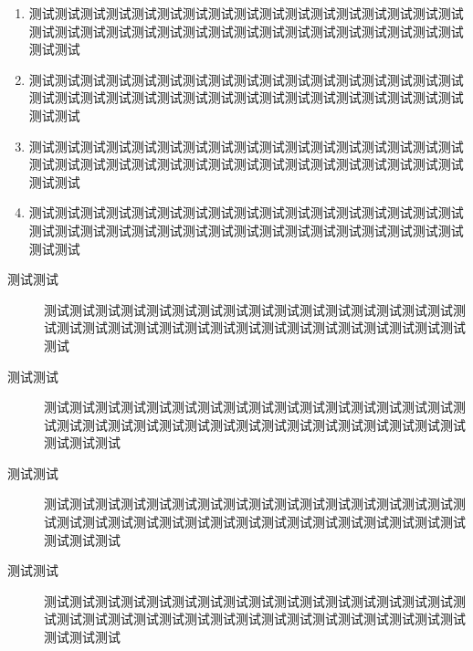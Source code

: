 \documentclass[degree=phd,nlcover]{njuthesis}
\begin{document}
\begin{enumerate}
    \item 测试测试测试测试测试测试测试测试测试测试测试测试测试测试测试测试测试测试测试测试测试测试测试测试测试测试测试测试测试测试测试测试测试测试测试测试
    \item 测试测试测试测试测试测试测试测试测试测试测试测试测试测试测试测试测试测试测试测试测试测试测试测试测试测试测试测试测试测试测试测试测试测试测试测试
    \item 测试测试测试测试测试测试测试测试测试测试测试测试测试测试测试测试测试测试测试测试测试测试测试测试测试测试测试测试测试测试测试测试测试测试测试测试
    \item 测试测试测试测试测试测试测试测试测试测试测试测试测试测试测试测试测试测试测试测试测试测试测试测试测试测试测试测试测试测试测试测试测试测试测试测试
\end{enumerate}

\begin{description}
    \item[测试测试] 测试测试测试测试测试测试测试测试测试测试测试测试测试测试测试测试测试测试测试测试测试测试测试测试测试测试测试测试测试测试测试测试测试测试
    \item[测试测试] 测试测试测试测试测试测试测试测试测试测试测试测试测试测试测试测试测试测试测试测试测试测试测试测试测试测试测试测试测试测试测试测试测试测试测试测试
    \item[测试测试] 测试测试测试测试测试测试测试测试测试测试测试测试测试测试测试测试测试测试测试测试测试测试测试测试测试测试测试测试测试测试测试测试测试测试测试测试
    \item[测试测试] 测试测试测试测试测试测试测试测试测试测试测试测试测试测试测试测试测试测试测试测试测试测试测试测试测试测试测试测试测试测试测试测试测试测试测试测试
\end{description}




\printbibliography



\appendix



\end{document}
